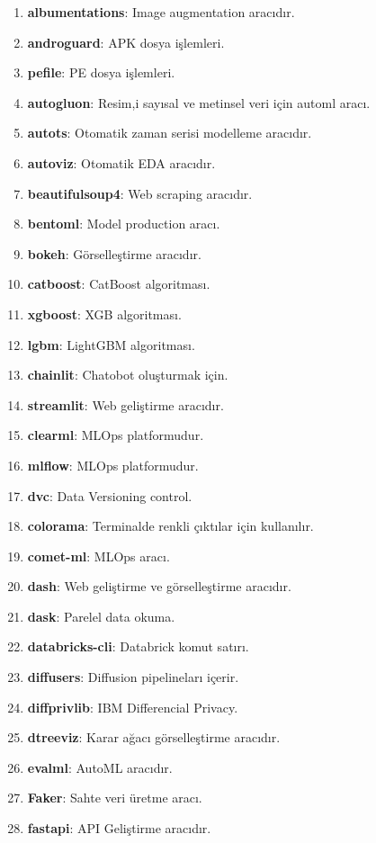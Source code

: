 \begin{enumerate}
    \item \textbf{albumentations}: Image augmentation aracıdır.
    \item \textbf{androguard}: APK dosya işlemleri.
    \item \textbf{pefile}: PE dosya işlemleri.
    \item \textbf{autogluon}: Resim,i sayısal ve metinsel veri için automl aracı.
    \item \textbf{autots}: Otomatik zaman serisi modelleme aracıdır.
    \item \textbf{autoviz}: Otomatik EDA aracıdır.
    \item \textbf{beautifulsoup4}: Web scraping aracıdır.
    \item \textbf{bentoml}: Model production aracı.
    \item \textbf{bokeh}: Görselleştirme aracıdır.
    \item \textbf{catboost}: CatBoost algoritması.
    \item \textbf{xgboost}: XGB algoritması.
    \item \textbf{lgbm}: LightGBM algoritması.
    \item \textbf{chainlit}: Chatobot oluşturmak için.
    \item \textbf{streamlit}: Web geliştirme aracıdır.
    \item \textbf{clearml}: MLOps platformudur.
    \item \textbf{mlflow}: MLOps platformudur.
    \item \textbf{dvc}: Data Versioning control.
    \item \textbf{colorama}: Terminalde renkli çıktılar için kullanılır.
    \item \textbf{comet-ml}: MLOps aracı.
    \item \textbf{dash}: Web geliştirme ve görselleştirme aracıdır.
    \item \textbf{dask}: Parelel data okuma.
    \item \textbf{databricks-cli}: Databrick komut satırı.
    \item \textbf{diffusers}: Diffusion pipelineları içerir.
    \item \textbf{diffprivlib}: IBM Differencial Privacy.
    \item \textbf{dtreeviz}: Karar ağacı görselleştirme aracıdır.
    \item \textbf{evalml}: AutoML aracıdır.
    \item \textbf{Faker}: Sahte veri üretme aracı.
    \item \textbf{fastapi}: API Geliştirme aracıdır.

\end{enumerate}
